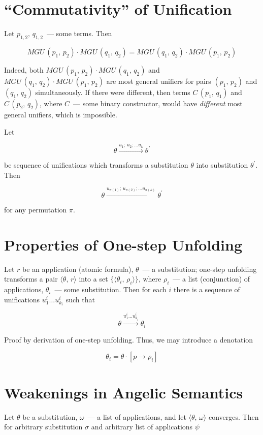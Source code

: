 \documentclass{article}[12pt]
\newcommand{\inbr}[1]{\langle #1 \rangle}
\begin{document}
\section{``Commutativity'' of Unification}

Let $p_{1,2},\,q_{1,2}$~--- some terms. Then

\[
MGU\,(p_1,\,p_2)\cdot MGU\,(q_1,\,q_2)=MGU\,(q_1,\,q_2)\cdot MGU\,(p_1,\,p_2)
\]

Indeed, both $MGU\,(p_1,\,p_2)\cdot MGU\,(q_1,\,q_2)$ and $MGU\,(q_1,\,q_2)\cdot MGU\,(p_1,\,p_2)$ are most general unifiers
for pairs $(p_1,\,p_2)$ and $(q_1,\,q_2)$ simultaneously. If there were different, then terms $C\,(p_1,\,q_1)$ and
$C\,(p_2,\,q_2)$, where $C$~--- some binary constructor, would have \emph{different} most general unifiers, which is impossible.

Let

\[
\theta\xrightarrow{u_1;\,u_2;\dots u_k}{\theta^\prime}
\]

be sequence of unifications which transforms a substitution $\theta$ into substitution $\theta^\prime$. Then

\[
\theta\xrightarrow{u_{\pi(1)};\,u_{\pi(2)};\dots u_{\pi(k)}}{\theta^\prime}
\]

for any permutation $\pi$.

\section{Properties of One-step Unfolding}

Let $r$ be an application (atomic formula), $\theta$~--- a substitution; one-step unfolding transforms a pair $\inbr{\theta,\,r}$ into
a set $\{\inbr{\theta_i,\,\rho_i}\}$, where $\rho_i$~--- a list (conjunction) of applications, $\theta_i$~--- some substitution. Then
for each $i$ there is a sequence of unifications $u^i_1\dots u^i_{k_i}$ such that

\[
\theta\xrightarrow{u^i_1\dots u^i_{k_i}}{\theta_i}
\]

Proof by derivation of one-step unfolding. Thus, we may introduce a denotation

\[
\theta_i=\theta\cdot[p\to\rho_i]
\]

\section{Weakenings in Angelic Semantics}

Let $\theta$ be a substitution, $\omega$~--- a list of applications, and let $\inbr{\theta,\,\omega}$ converges. Then for arbitrary substitution $\sigma$ and
arbitrary list of applications $\psi$
\end{document}
